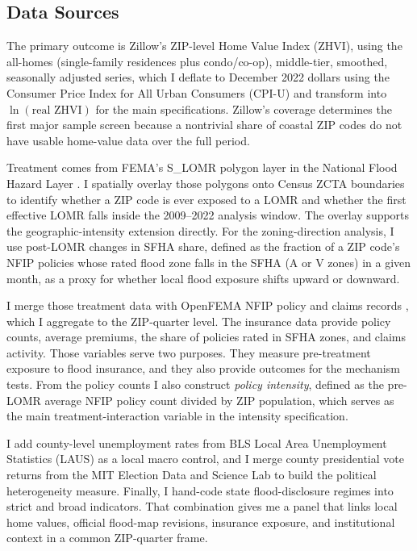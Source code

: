 \documentclass[12pt]{article}
\begin{document}
\subsection{Data Sources}\label{sec:data_sources}
The primary outcome is Zillow's ZIP-level Home Value Index (ZHVI), using the all-homes (single-family residences plus condo/co-op), middle-tier, smoothed, seasonally adjusted series, which I deflate to December 2022 dollars using the Consumer Price Index for All Urban Consumers (CPI-U) \citep{FRED_CPI} and transform into $\ln(\text{real ZHVI})$ for the main specifications. Zillow's coverage determines the first major sample screen because a nontrivial share of coastal ZIP codes do not have usable home-value data over the full period.

Treatment comes from FEMA's S\_LOMR polygon layer in the National Flood Hazard Layer \citep{FEMA_LOMR}. I spatially overlay those polygons onto Census ZCTA boundaries \citep{Census_ZCTA} to identify whether a ZIP code is ever exposed to a LOMR and whether the first effective LOMR falls inside the 2009--2022 analysis window. The overlay supports the geographic-intensity extension directly. For the zoning-direction analysis, I use post-LOMR changes in SFHA share, defined as the fraction of a ZIP code's NFIP policies whose rated flood zone falls in the SFHA (A or V zones) in a given month, as a proxy for whether local flood exposure shifts upward or downward.

I merge those treatment data with OpenFEMA NFIP policy and claims records \citep{FEMA_NFIP}, which I aggregate to the ZIP-quarter level. The insurance data provide policy counts, average premiums, the share of policies rated in SFHA zones, and claims activity. Those variables serve two purposes. They measure pre-treatment exposure to flood insurance, and they also provide outcomes for the mechanism tests. From the policy counts I also construct \textit{policy intensity}, defined as the pre-LOMR average NFIP policy count divided by ZIP population, which serves as the main treatment-interaction variable in the intensity specification.

I add county-level unemployment rates from BLS Local Area Unemployment Statistics (LAUS) \citep{BLS_LAUS} as a local macro control, and I merge county presidential vote returns from the MIT Election Data and Science Lab \citep{MIT_MEDSL} to build the political heterogeneity measure. Finally, I hand-code state flood-disclosure regimes into strict and broad indicators. That combination gives me a panel that links local home values, official flood-map revisions, insurance exposure, and institutional context in a common ZIP-quarter frame.
\end{document}
